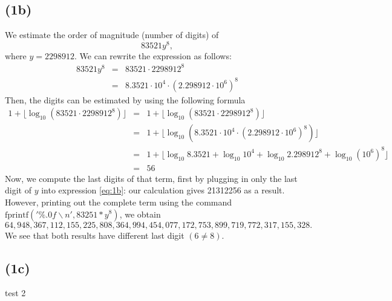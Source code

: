 \documentclass[11pt]{article}
\newcommand{\1}{\mathbbm{1}}
\begin{document}
\subsection*{(1b)}
We estimate the order of magnitude (number of digits) of 
\begin{equation}\label{eq:1b}
83521y^8,
\end{equation}
where $y=2298912$. We can rewrite the expression as follows:
	\begin{eqnarray*}
		83521y^8 &=& 83521\cdot 2298912^8\\
				 &=& 8.3521\cdot10^4 \cdot (2.298912\cdot10^6)^8
	\end{eqnarray*}
Then, the digits can be estimated by using the following formula 
	\begin{eqnarray*}
		1+\lfloor \log_{10} (83521\cdot 2298912^8)\rfloor &=& 1+\lfloor \log_{10} (83521\cdot 2298912^8)\rfloor\\
		&=&  1+\lfloor \log_{10} (8.3521\cdot10^4 \cdot (2.298912\cdot10^6)^8)\rfloor\\
			&=&  1+\lfloor \log_{10} 8.3521+\log_{10}10^4 + \log_{10}2.298912^8 +\log_{10} (10^6)^8\rfloor\\
			&=& 56
	\end{eqnarray*} 
Now, we compute the last digits of that term, first by plugging in only the last digit of $y$ into expression \eqref{eq:1b}: our calculation gives 21312256 as a result. However, printing out the complete term using the command $\text{fprintf}('\%.0f\backslash n',83251*y^8)$, we obtain 
\[64,948,367,112,155,225,808,364,994,454,077,172,753,899,719,772,317,155,328.\] 
We see that both results have different last digit $(6\neq8)$.




\subsection*{(1c)}
	test 2
\end{document}

